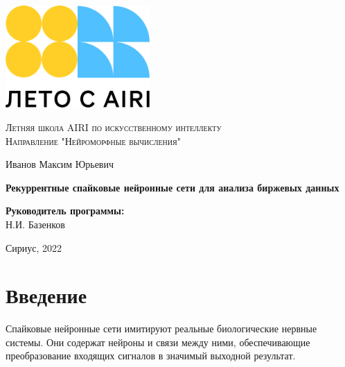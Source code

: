 \documentclass[a4paper,fontsize=12pt,titlepage,final]{scrartcl}
\begin{document}
\begin{titlepage}
    \begin{center}
    \includegraphics[width=55mm]{airi.png}
    
	{\small \textsc{Летняя школа AIRI по искусственному интеллекту}\\
	\textsc{Направление "Нейроморфные вычисления"}\\}
	
    \vspace{3cm}
    
    {\large Иванов Максим Юрьевич}\\
    
	\vspace{1cm}
	
	{\large \textbf{Рекуррентные спайковые нейронные сети для анализа биржевых данных}}\\
	
	\vspace{2cm}
	
	\vspace{4cm}
	
	\begin{flushright}
	    \textbf{Руководитель программы:}\\Н.И. Базенков\\
	\end{flushright}
    \end{center}
    \begin{center}
	\vfill
	\vspace{0,5cm}
	{\small Сириус, 2022}
    \end{center}
\end{titlepage}

\tableofcontents
\newpage

\section{Введение}

Спайковые нейронные сети имитируют реальные биологические нервные системы. Они содержат нейроны и связи между ними, обеспечивающие преобразование входящих сигналов в значимый выходной результат. 
\end{document}
